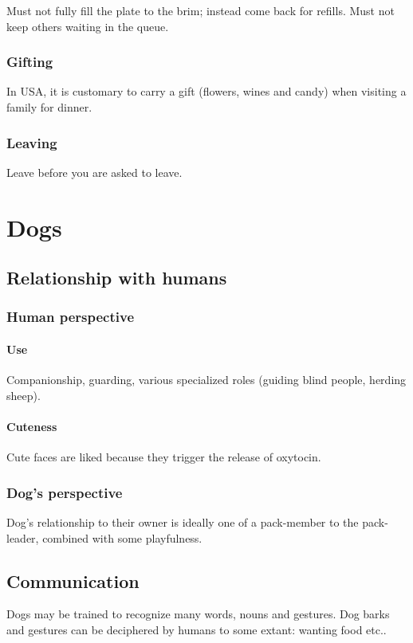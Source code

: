 \documentclass[oneside, article]{memoir}
\begin{document}
Must not fully fill the plate to the brim; instead come back for refills. Must not keep others waiting in the queue.

\subsection{Gifting}
In USA, it is customary to carry a gift (flowers, wines and candy) when visiting a family for dinner.

\subsection{Leaving}
Leave before you are asked to leave.

\chapter{Dogs}
\section{Relationship with humans}
\subsection{Human perspective}
\subsubsection{Use}
Companionship, guarding, various specialized roles (guiding blind people, herding sheep).

\subsubsection{Cuteness}
Cute faces are liked because they trigger the release of oxytocin.

\subsection{Dog's perspective}
Dog's relationship to their owner is ideally one of a pack-member to the pack-leader, combined with some playfulness.

\section{Communication}
Dogs may be trained to recognize many words, nouns and gestures. Dog barks and gestures can be deciphered by humans to some extant: wanting food etc..
\end{document}

